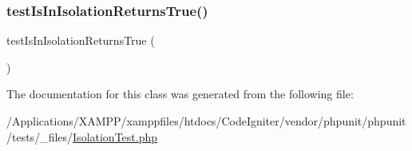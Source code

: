 \mbox{\label{class_isolation_test_aa8d1313a628c774492dbfffd159d91b5}} 
\subsubsection{\texorpdfstring{test\+Is\+In\+Isolation\+Returns\+True()}{testIsInIsolationReturnsTrue()}}
{\footnotesize\ttfamily test\+Is\+In\+Isolation\+Returns\+True (\begin{DoxyParamCaption}{ }\end{DoxyParamCaption})}



The documentation for this class was generated from the following file\+:\begin{DoxyCompactItemize}
\item 
/\+Applications/\+X\+A\+M\+P\+P/xamppfiles/htdocs/\+Code\+Igniter/vendor/phpunit/phpunit/tests/\+\_\+files/\mbox{\hyperlink{_isolation_test_8php}{Isolation\+Test.\+php}}\end{DoxyCompactItemize}
